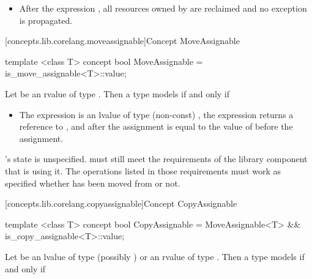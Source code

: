 \begin{addedblock}
\begin{itemdescr}
\begin{itemize}
\item After the expression , all resources owned by  are
reclaimed and no exception is propagated.
\end{itemize}
\end{itemdescr}

[concepts.lib.corelang.moveassignable]{Concept MoveAssignable}

%
\begin{itemdecl}
template <class T>
concept bool MoveAssignable =
  is_move_assignable<T>::value;
\end{itemdecl}

\begin{itemdescr}
\pnum
Let  be an rvalue of type . Then a type  models
 if and only if

\begin{itemize}
\item The expression  is an lvalue of type (non-const) , the expression returns
a reference to , and after the assignment  is equal to the value
of  before the assignment.
\end{itemize}

\pnum
{}'s state is unspecified. \enternote {} must still meet the
requirements of the library component that is using it. The operations listed
in those requirements must work as specified whether  has been moved
from or not.\exitnote
\end{itemdescr}

[concepts.lib.corelang.copyassignable]{Concept CopyAssignable}

%
\begin{itemdecl}
template <class T>
concept bool CopyAssignable =
  MoveAssignable<T> && is_copy_assignable<T>::value;
\end{itemdecl}

\begin{itemdescr}
\pnum
Let  be an lvalue of type (possibly )  or an rvalue
of type . Then a type  models  if
and only if


\end{itemdescr}
\end{addedblock}
